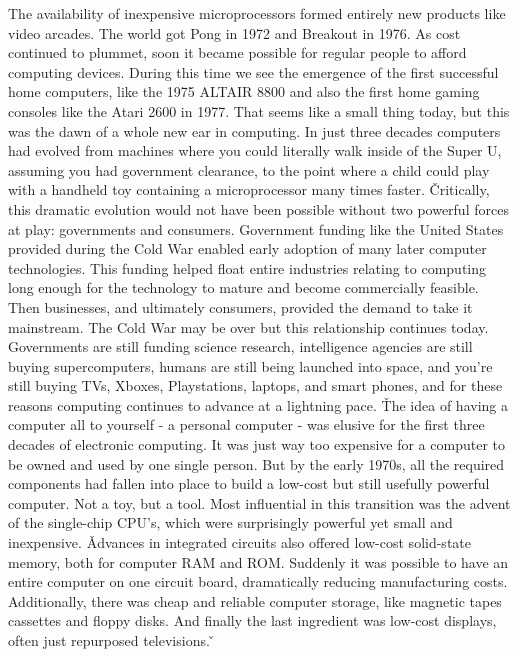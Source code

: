 The availability of inexpensive microprocessors formed entirely new products like video arcades. The world got Pong
in 1972 and Breakout in 1976. As cost continued to plummet, soon it became possible for regular people to afford
computing devices. During this time we see the emergence of the first successful home computers, like the 1975 ALTAIR
8800 and also the first home gaming consoles like the Atari 2600 in 1977. That seems like a small thing today, but
this was the dawn of a whole new ear in computing. In just three decades computers had evolved from machines where
you could literally walk inside of the Super U, assuming you had government clearance, to the point where a child
could play with a handheld toy containing a microprocessor many times faster. \v

Critically, this dramatic evolution would not have been possible without two powerful forces at play: governments and
consumers. Government funding like the United States provided during the Cold War enabled early adoption of many
later computer technologies. This funding helped float entire industries relating to computing long enough for the
technology to mature and become commercially feasible. Then businesses, and ultimately consumers, provided the demand
to take it mainstream. The Cold War may be over but this relationship continues today. Governments are still funding
science research, intelligence agencies are still buying supercomputers, humans are still being launched into space,
and you're still buying TVs, Xboxes, Playstations, laptops, and smart phones, and for these reasons computing
continues to advance at a lightning pace. \v

The idea of having a computer all to yourself - a personal computer - was elusive for the first three decades of
electronic computing. It was just way too expensive for a computer to be owned and used by one single person. But by
the early 1970s, all the required components had fallen into place to build a low-cost but still usefully powerful
computer. Not a toy, but a tool. Most influential in this transition was the advent of the single-chip CPU's, which
were surprisingly powerful yet small and inexpensive. \v

Advances in integrated circuits also offered low-cost solid-state memory, both for computer RAM and ROM. Suddenly it
was possible to have an entire computer on one circuit board, dramatically reducing manufacturing costs.
Additionally, there was cheap and reliable computer storage, like magnetic tapes cassettes and floppy disks. And
finally the last ingredient was low-cost displays, often just repurposed televisions.  \v

